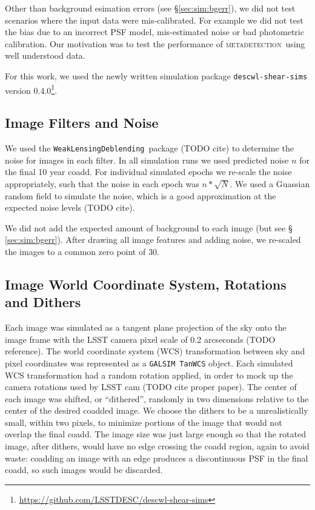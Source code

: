\documentclass[iop, twocolappendix, appendixfloats, numberedappendix, apj]{hackemulateapj}
\newcommand{\descwl}{\texttt{WeakLensingDeblending}}
\newcommand{\galsim}{\texttt{GALSIM}}
\newcommand{\mdet}{\textsc{metadetection}}
\begin{document}
Other than background esimation errors (see \S \ref{sec:sim:bgerr}), we did not
test scenarios where the input data were mis-calibrated.  For example we did
not test the bias due to an incorrect PSF model, mis-estimated noise or bad
photometric calibration.  Our motivation was to test the performance of \mdet\
using well understood data.

For this work, we used the newly written simulation package
\texttt{descwl-shear-sims} version
0.4.0\footnote{\url{https://github.com/LSSTDESC/descwl-shear-sims}}.

\subsection{Image Filters and Noise} \label{sec:sim:noise}

We used the \descwl\ package (TODO cite) to determine the
noise for images in each filter.  In all simulation runs we used predicted
noise $n$ for the final 10 year coadd.  For individual simulated epochs we
re-scale the noise appropriately, such that the noise in each epoch was $n *
\sqrt{N}$.  We used a Guassian random field to simulate the noise, which is a
good approximation at the expected noise levels (TODO cite).

We did not add the expected amount of background to each image (but see \S
\ref{sec:sim:bgerr}).  After drawing all image features and adding
noise, we re-scaled the images to a common zero point of 30.

\subsection{Image World Coordinate System, Rotations and Dithers} \label{sec:sim:rotdith}

Each image was simulated as a tangent plane projection of the sky onto the
image frame with the LSST camera pixel scale of 0.2 arcseconds (TODO reference).
The world coordinate system (WCS) transformation between sky and pixel
coordinates was represented as a \galsim\ \texttt{TanWCS} object.  Each
simulated WCS transformation had a random rotation applied, in order to mock up
the camera rotations used by LSST cam (TODO cite proper paper).  The center of
each image was shifted, or ``dithered'', randomly in two dimensions relative to
the center of the desired coadded image.  We choose the dithers to be a
unrealistically small, within two pixels, to minimize portions of the image
that would not overlap the final coadd.  The image size was just large enough
so that the rotated image, after dithers, would have no edge crossing the coadd
region, again to avoid waste:  coadding an image with an edge produces a
discontinuous PSF in the final coadd, so such images would be discarded.
\end{document}
